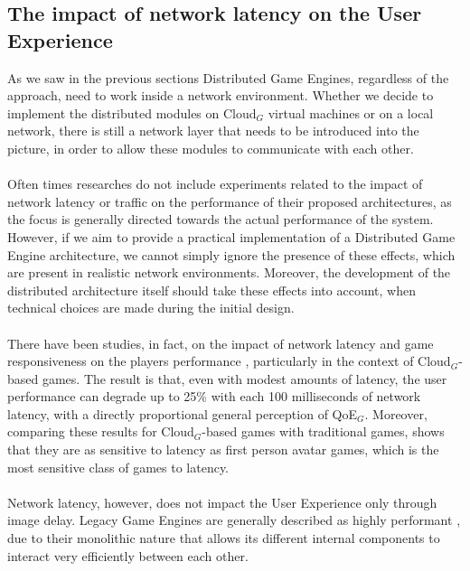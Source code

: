 \subsection{The impact of network latency on the User Experience}
As we saw in the previous sections Distributed Game Engines, regardless of the approach, need to work inside a network environment. Whether we decide to implement the distributed modules on Cloud$_G$ virtual machines or on a local network, there is still a network layer that needs to be introduced into the picture, in order to allow these modules to communicate with each other. \\ \\
Often times researches do not include experiments related to the impact of network latency or traffic on the performance of their proposed architectures, as the focus is generally directed towards the actual performance of the system. \\
However, if we aim to provide a practical implementation of a Distributed Game Engine architecture, we cannot simply ignore the presence of these effects, which are present in realistic network environments. Moreover, the development of the distributed architecture itself should take these effects into account, when technical choices are made during the initial design. \\ \\
There have been studies, in fact, on the impact of network latency and game responsiveness on the players performance \cite{womak:framerate-player-FPS, womak:user-tolerance-latency, womak:player-latency-cloud}, particularly in the context of Cloud$_G$-based games. The result is that, even with modest amounts of latency, the user performance can degrade up to 25\% with each 100 milliseconds of network latency, with a directly proportional general perception of QoE$_G$. Moreover, comparing these results for Cloud$_G$-based games with traditional games, shows that they are as sensitive to latency as first person avatar games, which is the most sensitive class of games to latency. \\ \\
Network latency, however, does not impact the User Experience only through image delay. Legacy Game Engines are generally described as highly performant \cite{womak:revamping-cloud-games}, due to their monolithic nature that allows its different internal components to interact very efficiently between each other. \\ \\
